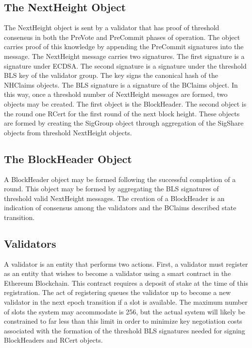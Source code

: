 \subsection{The NextHeight Object}



The NextHeight object is sent by a validator that has proof of
threshold consensus in both the PreVote and PreCommit phases of
operation.
The object carries proof of this knowledge by appending the PreCommit
signatures into the message.
The NextHeight message carries two signatures.
The first signature is a signature under \secp{} ECDSA.
The second signature is a signature under the threshold BLS key of the
validator group.
The \secp{} key signs the canonical hash of the NHClaims objects.
The BLS signature is a signature of the BClaims object.
In this way, once a threshold number of NextHeight messages are formed,
two objects may be created.
The first object is the BlockHeader.
The second object is the round one RCert for the first round of the
next block height.
These objects are formed by creating the SigGroup object through
aggregation of the SigShare objects from threshold NextHeight objects.


\subsection{The BlockHeader Object}



A BlockHeader object may be formed following the successful completion
of a round.
This object may be formed by aggregating the BLS signatures of
threshold valid NextHeight messages.
The creation of a BlockHeader is an indication of consensus among the
validators and the BClaims described state transition.


\subsection{Validators}

A validator is an entity that performs two actions.
First, a validator must register as an entity that wishes to become a
validator using a smart contract in the Ethereum Blockchain.
This contract requires a deposit of stake at the time of this
registration.
The act of registering queues the validator up to become a new
validator in the next epoch transition if a slot is available.
The maximum number of slots the system may accommodate is 256, but the
actual system will likely be constrained to far less than this limit in
order to minimize key negotiation costs associated with the formation
of the threshold BLS signatures needed for signing BlockHeaders and
RCert objects.

